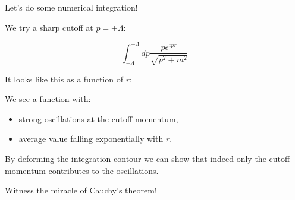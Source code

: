\documentclass{beamer}
\newcommand{\integrand}{\frac{p e^{ipr}}{\sqrt{p^2 + m^2}}}
\begin{document}

\begin{frame}
Let's do some numerical integration!
\end{frame}


\begin{frame}
We try a sharp cutoff at $p = \pm \Lambda$:

$$\int_{-\Lambda}^{+\Lambda} dp \integrand$$

It looks like this as a function of $r$:
\end{frame}






\begin{frame}
We see a function with:

\begin{itemize}
\pause
\item strong \alert{oscillations} at the cutoff momentum,

\pause
\item \alert{average value} falling \alert{exponentially} with $r$.
\end{itemize}

\pause
By deforming the integration contour we can show that indeed \alert{only}
the cutoff momentum contributes to the oscillations.
\end{frame}


\begin{frame}
Witness the miracle of \alert{Cauchy's theorem}!
\end{frame}



\end{document}
